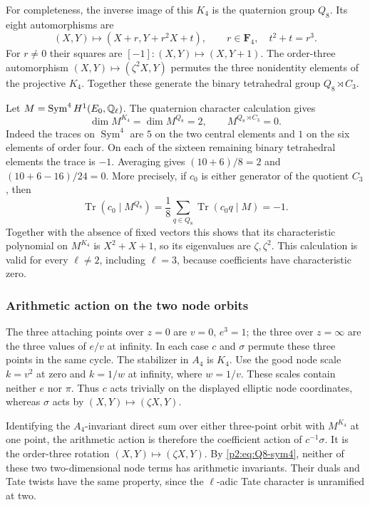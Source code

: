 For completeness, the inverse image of this $K_4$ is the quaternion
group $Q_8$.  Its eight automorphisms are
\[
 (X,Y)\longmapsto(X+r,Y+r^2X+t),\qquad
 r\in\mathbf F_4,\quad t^2+t=r^3.
\]
For $r\ne0$ their squares are $[-1]:(X,Y)\mapsto(X,Y+1)$.
The order-three automorphism $(X,Y)\mapsto(\zeta^2X,Y)$ permutes
the three nonidentity elements of the projective $K_4$.  Together
these generate the binary tetrahedral group $Q_8\rtimes C_3$.

Let $M=\operatorname{Sym}^4 H^1(E_0,\mathbb Q_\ell)$.  The quaternion
character calculation gives
\begin{equation}\label{p2:eq:Q8-sym4}
 \dim M^{K_4}=\dim M^{Q_8}=2,\qquad
 M^{Q_8\rtimes C_3}=0.
\end{equation}
Indeed the traces on $\operatorname{Sym}^4$ are $5$ on the two
central elements and $1$ on the six elements of order four.  On
each of the sixteen remaining binary tetrahedral elements the
trace is $-1$.  Averaging gives $(10+6)/8=2$ and
$(10+6-16)/24=0$.  More precisely, if $c_0$ is either generator
of the quotient $C_3$, then
\[
 \operatorname{Tr}(c_0\mid M^{Q_8})
 =\frac18\sum_{q\in Q_8}\operatorname{Tr}(c_0q\mid M)=-1.
\]
Together with the absence of fixed vectors this shows that its
characteristic polynomial on $M^{K_4}$ is $X^2+X+1$, so its
eigenvalues are $\zeta,\zeta^2$.
This calculation is valid for every $\ell\ne2$, including $\ell=3$,
because coefficients have characteristic zero.

\subsubsection{Arithmetic action on the two node orbits}
The three attaching points over $z=0$ are $v=0$, $e^3=1$;
the three over $z=\infty$ are the three values of $e/v$ at infinity.
In each case $c$ and $\sigma$ permute these three points in the same
cycle.  The stabilizer in $A_4$ is $K_4$.  Use the good node scale
$k=v^2$ at zero and $k=1/w$ at infinity, where $w=1/v$.
These scales contain neither $e$ nor $\pi$.  Thus $c$ acts trivially
on the displayed elliptic node coordinates, whereas $\sigma$ acts
by $(X,Y)\mapsto(\zeta X,Y)$.

Identifying the $A_4$-invariant direct sum over either three-point
orbit with $M^{K_4}$ at one point, the arithmetic action is therefore
the coefficient action of $c^{-1}\sigma$.  It is the order-three
rotation $(X,Y)\mapsto(\zeta X,Y)$.  By \eqref{p2:eq:Q8-sym4}, neither
of these two two-dimensional node terms has arithmetic invariants.
Their duals and Tate twists have the same property, since the
$\ell$-adic Tate character is unramified at two.

